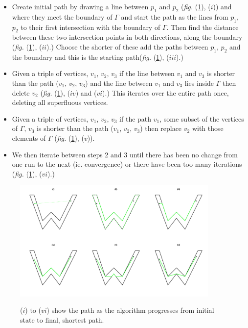 \documentclass[a4paper,10pt]{amsart}
\newcommand{\fig}[1]{\emph{fig.} (\ref{#1})}
\begin{document}
\begin{itemize}
\item Create initial path by drawing a line between $p_1$ and $p_2$ (\fig{wdia}, ($i$)) and where they meet the boundary of $\Gamma$ and start the path as the lines from $p_1$, $p_2$ to their first intersection with the boundary of $\Gamma$. Then find the distance between these two intersection points in both directions, along the boundary (\fig{wdia}, ($ii$).) Choose the shorter of these add the paths between $p_1$, $p_2$ and the boundary and this is the starting path(\fig{wdia}, ($iii$).) 
\item Given a triple of vertices, $v_1$, $v_2$, $v_3$ if the line between $v_1$ and $v_3$ is shorter than the path ($v_1$, $v_2$, $v_3$) and the line between $v_1$ and $v_3$ lies inside $\Gamma$ then delete $v_2$ (\fig{wdia}, ($iv$) and ($vi$).) This iterates over the entire path once, deleting all superfluous vertices. 
\item Given a triple of vertices, $v_1$, $v_2$, $v_3$ if the path $v_1$, some subset of the vertices of $\Gamma$, $v_3$ is shorter than the path ($v_1$, $v_2$, $v_3$) then replace $v_2$ with those elements of $\Gamma$ (\fig{wdia}, ($v$)). 
\item We then iterate between steps 2 and 3 until there has been no change from one run to the next (ie. convergence) or there have been too many iterations (\fig{wdia}, ($vi$).)
\end{itemize}

\begin{figure}
\centering
\includegraphics[trim=0in 0.5in 0in 0.25in, width=4in]{figs/wdia.pdf} \\
\caption{($i$) to ($vi$) show the path as the algorithm progresses from initial state to final, shortest path. }
\label{wdia}
\end{figure}
\end{document}
